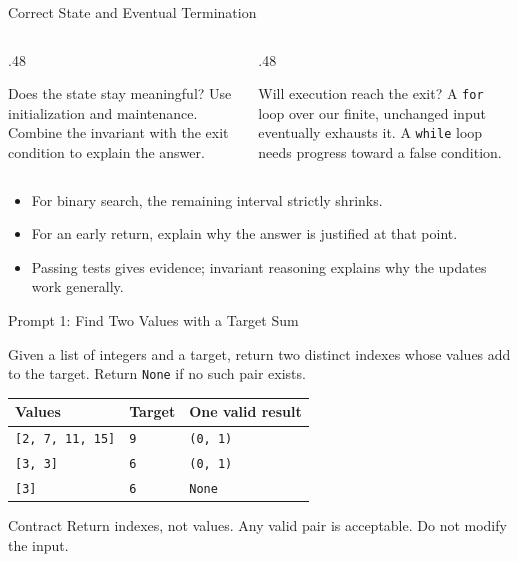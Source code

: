 \documentclass[aspectratio=169,10pt]{beamer}
\begin{document}
\begin{frame}{Correct State and Eventual Termination}
\small
\begin{columns}[T,onlytextwidth]
\begin{column}{.48\textwidth}
\begin{block}{Does the state stay meaningful?}
Use initialization and maintenance. Combine the invariant with the exit condition to explain the answer.
\end{block}
\end{column}
\begin{column}{.48\textwidth}
\begin{block}{Will execution reach the exit?}
A \texttt{for} loop over our finite, unchanged input eventually exhausts it. A \texttt{while} loop needs progress toward a false condition.
\end{block}
\end{column}
\end{columns}
\begin{itemize}
 \item For binary search, the remaining interval strictly shrinks.
 \item For an early return, explain why the answer is justified at that point.
 \item Passing tests gives evidence; invariant reasoning explains why the updates work generally.
\end{itemize}
\end{frame}


\begin{frame}{Prompt 1: Find Two Values with a Target Sum}
\small
\begin{activity}
Given a list of integers and a target, return two distinct indexes whose values add to the target. Return \texttt{None} if no such pair exists.
\end{activity}
\begin{center}
\begin{tabular}{lll}
\textbf{Values} & \textbf{Target} & \textbf{One valid result}\\\hline
\texttt{[2, 7, 11, 15]} & \texttt{9} & \texttt{(0, 1)}\\
\texttt{[3, 3]} & \texttt{6} & \texttt{(0, 1)}\\
\texttt{[3]} & \texttt{6} & \texttt{None}
\end{tabular}
\end{center}
\begin{block}{Contract}
Return indexes, not values. Any valid pair is acceptable. Do not modify the input.
\end{block}
\end{frame}
\end{document}
